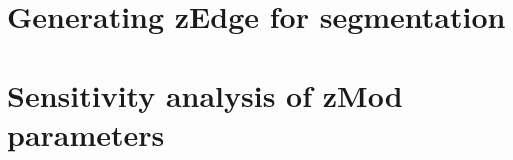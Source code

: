


\section{Generating zEdge for segmentation}


\section{Sensitivity analysis of zMod parameters}


